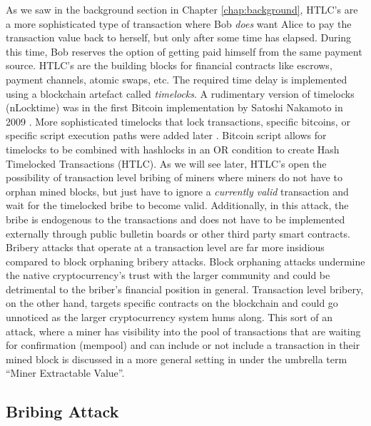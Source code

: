 As we saw in the background section in Chapter \ref{chap:background}, HTLC's are a more sophisticated type of transaction where Bob \emph{does} want Alice to pay the transaction value back to herself, but only after some time has elapsed. During this time, Bob reserves the option of getting paid himself from the same payment source. HTLC's are the building blocks for financial contracts like escrows, payment channels, atomic swaps, etc. The required time delay is implemented using a blockchain artefact called \emph{timelocks}. A rudimentary version of timelocks (nLocktime) was in the first Bitcoin implementation by Satoshi Nakamoto in 2009 \cite{satoshi_bitcoin_release_0_1_0}. More sophisticated timelocks that lock transactions, specific bitcoins, or specific script execution paths were added later \cite{BIP68} \cite{BIP65} \cite{BIP112}. Bitcoin script allows for timelocks to be combined with hashlocks in an OR condition to create Hash Timelocked Transactions (HTLC). As we will see later, HTLC's open the possibility of transaction level bribing of miners where miners do not have to orphan mined blocks, but just have to ignore a \emph{currently valid} transaction and wait for the timelocked bribe to become valid. Additionally, in this attack, the bribe is endogenous to the transactions and does not have to be implemented externally through public bulletin boards or other third party smart contracts. Bribery attacks that operate at a transaction level are far more insidious compared to block orphaning bribery attacks. Block orphaning attacks undermine the native cryptocurrency's trust with the larger community and could be detrimental to the briber's financial position in general. Transaction level bribery, on the other hand, targets specific contracts on the blockchain and could go unnoticed as the larger cryptocurrency system hums along. This sort of an attack, where a miner has visibility into the pool of transactions that are waiting for confirmation (mempool) and can include or not include a transaction in their mined block is discussed in a more general setting in \cite{daian2020flash} under the umbrella term ``Miner Extractable Value''.

\subsection{Bribing Attack}

